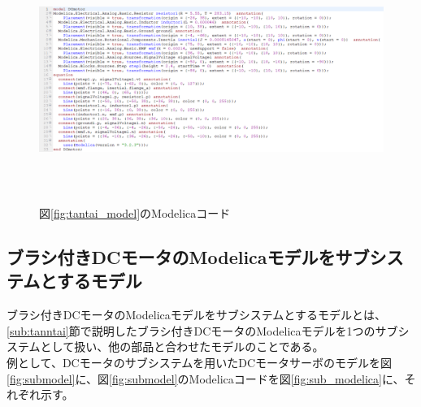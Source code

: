 % 	

\begin{figure}[t]
	\centering
	\includegraphics[width=16.5cm,height=8cm]{./Image/tantai_modelica.png}
	\caption{図\ref{fig:tantai_model}のModelicaコード}
	\label{fig:tantai_modelica}
  \end{figure}


\subsection{ブラシ付きDCモータのModelicaモデルをサブシステムとするモデル} \label{sub:submodel}
ブラシ付きDCモータのModelicaモデルをサブシステム\cite{modelicaシステム本}とするモデルとは、
\ref{sub:tanntai}節で説明したブラシ付きDCモータのModelicaモデルを1つのサブシステムとして扱い、他の部品と合わせたモデルのことである。\\
例として、DCモータのサブシステムを用いたDCモータサーボのモデルを図\ref{fig:submodel}に、図\ref{fig:submodel}のModelicaコードを図\ref{fig:sub_modelica}に、それぞれ示す。

